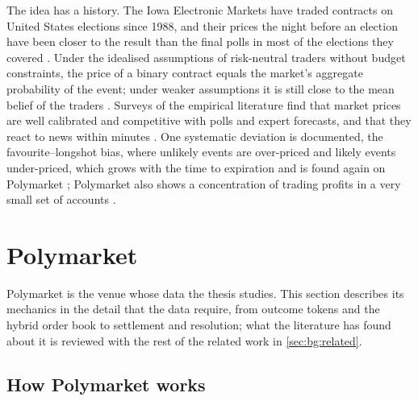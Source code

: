 The idea has a history.  The Iowa Electronic Markets have traded contracts on United
States elections since 1988, and their prices the night before an election have been
closer to the result than the final polls in most of the elections they covered
\cite{berg2008iem}.  Under the idealised assumptions of
risk-neutral traders without budget constraints, the price of a binary contract equals the
market's aggregate probability of the event; under weaker assumptions it is still close to
the mean belief of the traders \cite{wolfers2004prediction,manski2006interpreting}.
Surveys of the empirical literature find that market prices are well calibrated and
competitive with polls and expert forecasts, and that they react to news within minutes
\cite{wolfers2004prediction,snowberg2012prediction}.  One systematic deviation is
documented, the favourite--longshot bias, where unlikely events are over-priced and likely
events under-priced, which grows with the time to expiration \cite{page2013calibrated} and
is found again on Polymarket \cite{cardozo2026favorite}; Polymarket also shows a
concentration of trading profits in a very small set of accounts \cite{akey2026whowins}.

\section{Polymarket}
\label{ch:pm}

Polymarket is the venue whose data the thesis studies.  This section describes its
mechanics in the detail that the data require, from outcome tokens and the hybrid order
book to settlement and resolution; what the literature has found about it is reviewed with
the rest of the related work in \cref{sec:bg:related}.

\subsection{How Polymarket works}
\label{sec:pm:mechanics}

